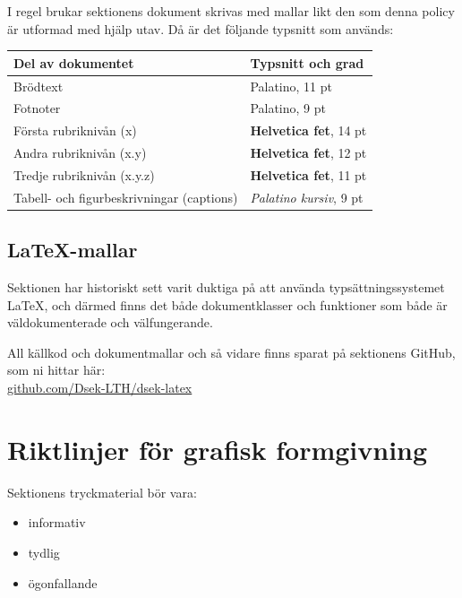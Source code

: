 \documentclass[]{dsekkallelse}
\begin{document}
I regel brukar sektionens dokument skrivas med mallar likt den som denna policy är utformad med hjälp utav. Då är det följande typsnitt som används:

\begin{table}[!hbp]
    \centering
    \begin{tabular}{ll}
        \toprule
        \textbf{Del av dokumentet}                & \textbf{Typsnitt och grad}                 \\
        \midrule
        Brödtext                                  & Palatino, 11 pt                            \\
        Fotnoter                                  & Palatino, 9 pt                             \\
        Första rubriknivån (x)                    & {\sffamily \bfseries Helvetica fet}, 14 pt \\
        Andra rubriknivån (x.y)                   & {\sffamily \bfseries Helvetica fet}, 12 pt \\
        Tredje rubriknivån (x.y.z)                & {\sffamily \bfseries Helvetica fet}, 11 pt \\
        Tabell- och figurbeskrivningar (captions) & \textit{Palatino kursiv}, 9 pt             \\

        \bottomrule
    \end{tabular}
    \label{tab:my_label}
\end{table}

\subsection{\LaTeX-mallar}
Sektionen har historiskt sett varit duktiga på att använda typsättningssystemet \LaTeX, och därmed finns det både dokumentklasser och funktioner som både är väldokumenterade och välfungerande.

All källkod och dokumentmallar och så vidare finns sparat på sektionens GitHub, som ni hittar här: \\
\href{https://github.com/Dsek-LTH/dsek-latex}{github.com/Dsek-LTH/dsek-latex}

\section{Riktlinjer för grafisk formgivning}
Sektionens tryckmaterial bör vara:
\begin{itemize}
    \item informativ
    \item tydlig
    \item ögonfallande
\end{itemize}
\end{document}
